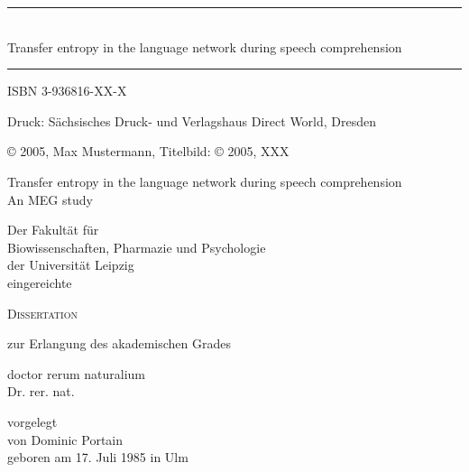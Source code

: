 
\thispagestyle{empty}
\begin{titlepage}


\vspace*{3cm}

\begin{center}
  \rule{14.5cm}{0.5mm}\\
  \vspace{0.5cm}
  \huge
  Transfer entropy in the language network during speech comprehension
  \rule{14.5cm}{0.5mm}
\end{center}

\clearpage
\thispagestyle{empty}
\vspace*{18cm}
\footnotesize{
ISBN 3-936816-XX-X
\vspace{1cm}

Druck: S\"achsisches Druck- und Verlagshaus Direct World, Dresden

\copyright \hspace*{1.5mm} 2005, Max Mustermann, Titelbild: \copyright \hspace*{1.5mm} 2005, XXX
}
\clearpage
\thispagestyle{empty}


\begin{center}
\normalsize
  {\huge Transfer entropy in the language network during speech comprehension\\An MEG study}

  \vfill

  Der Fakult\"at für\\
  Biowissenschaften, Pharmazie und Psychologie\\
  der Universit\"at Leipzig\\
  eingereichte

  \vfill

  {\LARGE \textsc{Dissertation}}

  zur Erlangung des akademischen Grades

  doctor rerum naturalium\\
  Dr. rer. nat.

  \vfill

  vorgelegt\\
  von Dominic Portain\\
  geboren am 17. Juli 1985 in Ulm


\end{center}
\end{titlepage}
